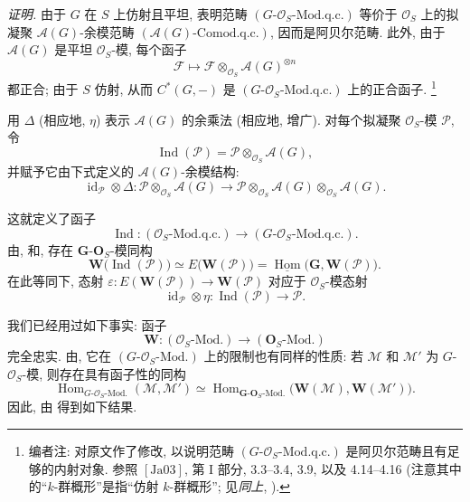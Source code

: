 \medskip
\noindent\textit{证明.}
由于 \(G\) 在 \(S\) 上仿射且平坦,  表明范畴
\((G\text{-}\mathscr O_S\text{-Mod.q.c.})\) 等价于
\(\mathscr O_S\) 上的拟凝聚 \(\mathscr A(G)\)-余模范畴
\((\mathscr A(G)\text{-Comod.q.c.})\), 因而是阿贝尔范畴.
此外, 由于 \(\mathscr A(G)\) 是平坦 \(\mathscr O_S\)-模, 每个函子
\[
  \mathscr F\longmapsto
    \mathscr F\otimes_{\mathscr O_S}\mathscr A(G)^{\otimes n}
\]
都正合; 由于 \(S\) 仿射, 从而 \(C^*(G,-)\) 是
\((G\text{-}\mathscr O_S\text{-Mod.q.c.})\) 上的正合函子.
\footnote{编者注: 对原文作了修改, 以说明范畴
\((G\text{-}\mathscr O_S\text{-Mod.q.c.})\) 是阿贝尔范畴且有足够的内射对象.
参照 \([\mathrm{Ja}03]\), 第 I 部分,
3.3--3.4, 3.9,  以及 4.14--4.16
(注意其中的``\(k\)-群概形''是指``仿射 \(k\)-群概形'';
见\emph{同上}, ).}

用 \(\Delta\) (相应地, \(\eta\)) 表示 \(\mathscr A(G)\) 的余乘法
(相应地, 增广). 对每个拟凝聚 \(\mathscr O_S\)-模 \(\mathscr P\), 令
\[
  \operatorname{Ind}(\mathscr P)
    =\mathscr P\otimes_{\mathscr O_S}\mathscr A(G),
\]
并赋予它由下式定义的 \(\mathscr A(G)\)-余模结构:
\[
  \operatorname{id}_{\mathscr P}\otimes\Delta:
  \mathscr P\otimes_{\mathscr O_S}\mathscr A(G)
    \longrightarrow
  \mathscr P\otimes_{\mathscr O_S}\mathscr A(G)
    \otimes_{\mathscr O_S}\mathscr A(G).
\]

这就定义了函子
\[
  \operatorname{Ind}:(\mathscr O_S\text{-Mod.q.c.})
    \longrightarrow(G\text{-}\mathscr O_S\text{-Mod.q.c.}).
\]
由,
 和,
存在 \(\mathbf G\)-\(\mathbf O_S\)-模同构
\[
  \tag{*}\label{sga3:i:theorem:5-3-1:equation:star}
  \mathbf W\bigl(\operatorname{Ind}(\mathscr P)\bigr)
    \simeq E\bigl(\mathbf W(\mathscr P)\bigr)
    =\underline{\operatorname{Hom}}
       \bigl(\mathbf G,\mathbf W(\mathscr P)\bigr).
\]
在此等同下, 态射
\(\varepsilon:E(\mathbf W(\mathscr P))\to\mathbf W(\mathscr P)\)
对应于 \(\mathscr O_S\)-模态射
\[
  \operatorname{id}_{\mathscr P}\otimes\eta:
    \operatorname{Ind}(\mathscr P)\longrightarrow\mathscr P.
\]

我们已经用过如下事实: 函子
\[
  \mathbf W:(\mathscr O_S\text{-Mod.})
    \longrightarrow(\mathbf O_S\text{-Mod.})
\]
完全忠实. 由,
它在 \((G\text{-}\mathscr O_S\text{-Mod.})\) 上的限制也有同样的性质:
若 \(\mathscr M\) 和 \(\mathscr M'\) 为 \(G\)-\(\mathscr O_S\)-模,
则存在具有函子性的同构
\[
  \operatorname{Hom}_{G\text{-}\mathscr O_S\text{-Mod.}}
    (\mathscr M,\mathscr M')
  \simeq
  \operatorname{Hom}_{\mathbf G\text{-}\mathbf O_S\text{-Mod.}}
    \bigl(\mathbf W(\mathscr M),\mathbf W(\mathscr M')\bigr).
\]
因此, 由 得到如下结果.

